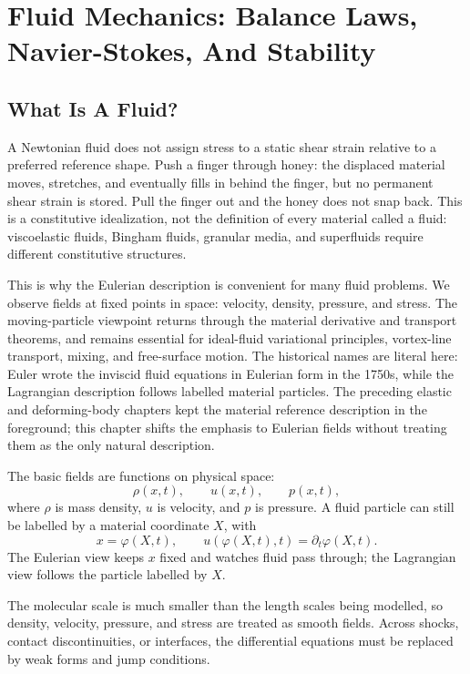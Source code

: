 \chapter[Fluid Mechanics]{Fluid Mechanics: Balance Laws, Navier-Stokes, And Stability}
\label{chap:fluid}

\section{What Is A Fluid?}
\label{sec:what-is-fluid}

A Newtonian fluid does not assign stress to a static shear strain relative to a
preferred reference shape. Push a finger through honey: the displaced material
moves, stretches, and eventually fills in behind the finger, but no permanent
shear strain is stored. Pull the finger out and the honey does not snap back.
This is a constitutive idealization, not the definition of every material
called a fluid: viscoelastic fluids, Bingham fluids, granular media, and
superfluids require different constitutive structures.

This is why the Eulerian description is convenient for many fluid problems. We
observe fields at fixed points in space: velocity, density, pressure, and
stress. The moving-particle viewpoint returns through the material derivative
and transport theorems, and remains essential for ideal-fluid variational
principles, vortex-line transport, mixing, and free-surface motion. The
historical names are literal here: Euler wrote the inviscid fluid equations in
Eulerian form in the 1750s, while the Lagrangian description follows labelled
material particles. The preceding elastic and deforming-body chapters kept the
material reference description in the foreground; this chapter shifts the
emphasis to Eulerian fields without treating them as the only natural
description.

The basic fields are functions on physical space:
\[
  \rho(x,t),\qquad u(x,t),\qquad p(x,t),
\]
where \(\rho\) is mass density, \(u\) is velocity, and \(p\) is pressure. A
fluid particle can still be labelled by a material coordinate \(X\), with
\[
  x=\varphi(X,t),\qquad u(\varphi(X,t),t)=\partial_t\varphi(X,t).
\]
The Eulerian view keeps \(x\) fixed and watches fluid pass through; the
Lagrangian view follows the particle labelled by \(X\).

\begin{assumption}
The molecular scale is much smaller than the length scales being modelled, so
density, velocity, pressure, and stress are treated as smooth fields. Across
shocks, contact discontinuities, or interfaces, the differential equations must
be replaced by weak forms and jump conditions.
\end{assumption}

